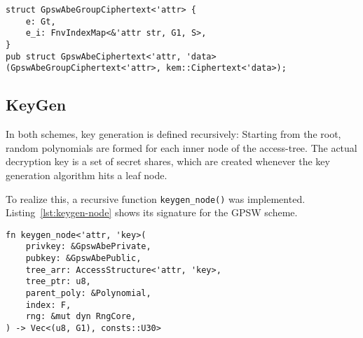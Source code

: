 \begin{lstlisting}[float=h,caption={ABE ciphertext structure for GPSW},label={lst:struct-cipher}, breaklines=true]
struct GpswAbeGroupCiphertext<'attr> {
    e: Gt, 
    e_i: FnvIndexMap<&'attr str, G1, S>,
}
pub struct GpswAbeCiphertext<'attr, 'data>(GpswAbeGroupCiphertext<'attr>, kem::Ciphertext<'data>);
\end{lstlisting}

  

\subsection{KeyGen}
In both schemes, key generation is defined recursively:
Starting from the root, random polynomials are formed for each inner node of the \gls{access-tree}.
The actual decryption key is a set of secret shares, which are created whenever the key generation algorithm hits a leaf node.

To realize this, a recursive function \verb+keygen_node()+ was implemented.
Listing~\ref{lst:keygen-node} shows its signature for the GPSW scheme. 

\begin{lstlisting}[float=h,caption={Function signature of recursive key generation},label={lst:keygen-node}]
fn keygen_node<'attr, 'key>(
    privkey: &GpswAbePrivate,
    pubkey: &GpswAbePublic,
    tree_arr: AccessStructure<'attr, 'key>,
    tree_ptr: u8,
    parent_poly: &Polynomial,
    index: F,
    rng: &mut dyn RngCore,
) -> Vec<(u8, G1), consts::U30> 
\end{lstlisting}

